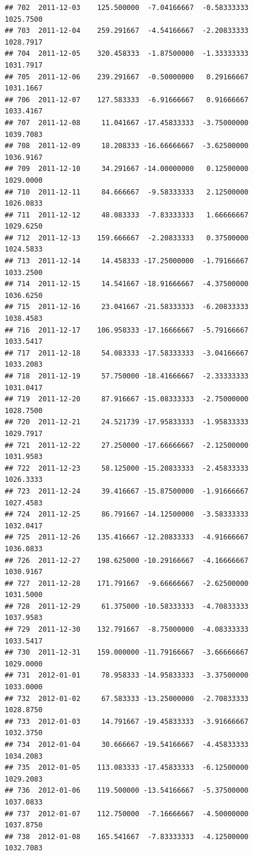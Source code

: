 \documentclass[
]{article}
\begin{document}
\begin{verbatim}
## 702  2011-12-03    125.500000  -7.04166667  -0.58333333    1025.7500
## 703  2011-12-04    259.291667  -4.54166667  -2.20833333    1028.7917
## 704  2011-12-05    320.458333  -1.87500000  -1.33333333    1031.7917
## 705  2011-12-06    239.291667  -0.50000000   0.29166667    1031.1667
## 706  2011-12-07    127.583333  -6.91666667   0.91666667    1033.4167
## 707  2011-12-08     11.041667 -17.45833333  -3.75000000    1039.7083
## 708  2011-12-09     18.208333 -16.66666667  -3.62500000    1036.9167
## 709  2011-12-10     34.291667 -14.00000000   0.12500000    1029.0000
## 710  2011-12-11     84.666667  -9.58333333   2.12500000    1026.0833
## 711  2011-12-12     48.083333  -7.83333333   1.66666667    1029.6250
## 712  2011-12-13    159.666667  -2.20833333   0.37500000    1024.5833
## 713  2011-12-14     14.458333 -17.25000000  -1.79166667    1033.2500
## 714  2011-12-15     14.541667 -18.91666667  -4.37500000    1036.6250
## 715  2011-12-16     23.041667 -21.58333333  -6.20833333    1038.4583
## 716  2011-12-17    106.958333 -17.16666667  -5.79166667    1033.5417
## 717  2011-12-18     54.083333 -17.58333333  -3.04166667    1033.2083
## 718  2011-12-19     57.750000 -18.41666667  -2.33333333    1031.0417
## 719  2011-12-20     87.916667 -15.08333333  -2.75000000    1028.7500
## 720  2011-12-21     24.521739 -17.95833333  -1.95833333    1029.7917
## 721  2011-12-22     27.250000 -17.66666667  -2.12500000    1031.9583
## 722  2011-12-23     58.125000 -15.20833333  -2.45833333    1026.3333
## 723  2011-12-24     39.416667 -15.87500000  -1.91666667    1027.4583
## 724  2011-12-25     86.791667 -14.12500000  -3.58333333    1032.0417
## 725  2011-12-26    135.416667 -12.20833333  -4.91666667    1036.0833
## 726  2011-12-27    198.625000 -10.29166667  -4.16666667    1030.9167
## 727  2011-12-28    171.791667  -9.66666667  -2.62500000    1031.5000
## 728  2011-12-29     61.375000 -10.58333333  -4.70833333    1037.9583
## 729  2011-12-30    132.791667  -8.75000000  -4.08333333    1033.5417
## 730  2011-12-31    159.000000 -11.79166667  -3.66666667    1029.0000
## 731  2012-01-01     78.958333 -14.95833333  -3.37500000    1033.0000
## 732  2012-01-02     67.583333 -13.25000000  -2.70833333    1028.8750
## 733  2012-01-03     14.791667 -19.45833333  -3.91666667    1032.3750
## 734  2012-01-04     30.666667 -19.54166667  -4.45833333    1034.2083
## 735  2012-01-05    113.083333 -17.45833333  -6.12500000    1029.2083
## 736  2012-01-06    119.500000 -13.54166667  -5.37500000    1037.0833
## 737  2012-01-07    112.750000  -7.16666667  -4.50000000    1037.8750
## 738  2012-01-08    165.541667  -7.83333333  -4.12500000    1032.7083

\end{verbatim}
\end{document}
